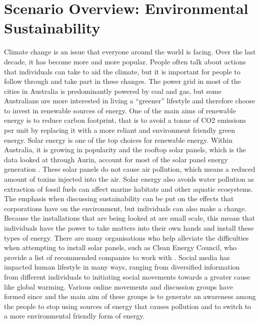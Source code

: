 \documentclass[11pt, oneside]{article}
\begin{document}
\section{Scenario Overview: Environmental Sustainability}
\label{sec:scenario_description_environmental_sustainability}
Climate change is an issue that everyone around the world is facing. Over the last decade, it has become more and more popular. People often talk about actions that individuals can take to aid the climate, but it is important for people to follow through and take part in these changes. 
\newline 
The power grid in most of the cities in Australia is predominantly powered by coal and gas, but some Australians are more interested in living a \enquote{greener} lifestyle and therefore choose to invest in renewable sources of energy. One of the main aims of renewable energy is to reduce carbon footprint, that is to avoid a tonne of CO2 emissions per unit by replacing it with a more reliant and environment friendly green energy.
\newline
\newline
Solar energy is one of the top choices for renewable energy. Within Australia, it is growing in popularity and the rooftop solar panels, which is the data looked at through Aurin, account for most of the solar panel energy generation \citep{solar_energy_australia}. These solar panels do not cause air pollution, which means a reduced amount of toxins injected into the air. Solar energy also avoids water pollution as extraction of fossil fuels can affect marine habitats and other aquatic ecosystems. 
\newline
\newline
The emphasis when discussing sustainability can be put on the effects that corporations have on the environment, but individuals can also make a change. Because the installations that are being looked at are small scale, this means that individuals have the power to take matters into their own hands and install these types of energy. There are many organisations who help alleviate the difficulties when attempting to install solar panels, such as Clean Energy Council, who provide a list of recommended companies to work with \citep{clean_energy_australia}.
\newline
\newline
Social media has impacted human lifestyle in many ways, ranging from diversified information from different individuals to initiating social movements towards a greater cause like global warming. Various online movements and discussion groups have formed since and the main aim of these groups is to generate an awareness among the people to stop using sources of energy that causes pollution and to switch to a more environmental friendly form of energy. 
\end{document}
